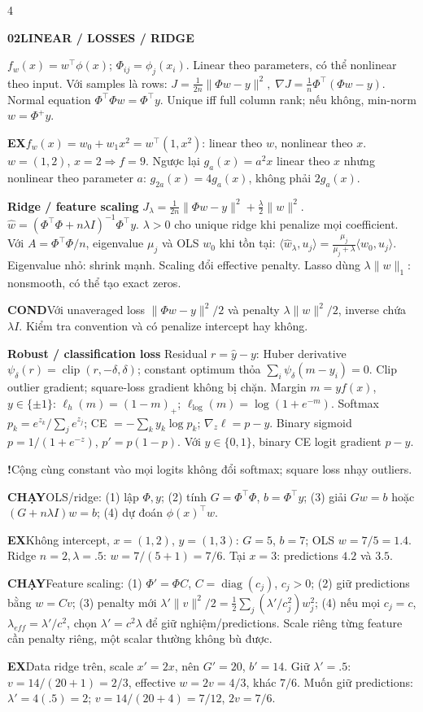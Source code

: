 \documentclass[a4paper]{article}
\newcommand{\topic}[2]{\par\addvspace{.8pt}%
  \begingroup\setlength{\fboxsep}{0.5pt}%
  \noindent\colorbox{structure}{\parbox{\dimexpr\linewidth-2\fboxsep\relax}{%
    \color{white}\fontsize{6.5}{7.1}\selectfont\bfseries #1\enspace #2}}%
  \endgroup\par\nobreak\vspace{.3pt}\nobreak}
\newcommand{\run}[1]{\key{CHẠY}#1}
\newcommand{\key}[1]{\par\textcolor{structure}{\textbf{#1}}\enspace}
\newcommand{\note}[4]{\par\begingroup\setlength{\fboxsep}{0.15pt}%
  \noindent\colorbox{#1}{\parbox{\dimexpr\linewidth-2\fboxsep\relax}{%
    \RaggedRight\textcolor{#2}{\textbf{#3}}\enspace #4}}%
  \endgroup\par}
\newcommand{\cond}[1]{\note{conditionbg}{condition}{COND}{#1}}
\newcommand{\trap}[1]{\note{warningbg}{warning}{!}{#1}}
\newcommand{\ex}[1]{\note{examplebg}{example}{EX}{#1}}
\newcommand{\norm}[1]{\lVert#1\rVert}
\newcommand{\diag}{\operatorname{diag}}
\begin{document}
\begin{multicols*}{4}
\topic{02}{LINEAR / LOSSES / RIDGE}
$f_w(x)=w^\top\phi(x)$; $\Phi_{ij}=\phi_j(x_i)$. Linear theo parameters, có thể nonlinear theo input. Với samples là rows:
$J=\tfrac1{2n}\norm{\Phi w-y}^2,\; \nabla J=\tfrac1n\Phi^\top(\Phi w-y).$
Normal equation $\Phi^\top\Phi w=\Phi^\top y$. Unique iff full column rank; nếu không, min-norm $w=\Phi^+y$.
\ex{$f_w(x)=w_0+w_1x^2=w^\top(1,x^2)$: linear theo $w$, nonlinear theo $x$. $w=(1,2)$, $x=2\Rightarrow f=9$. Ngược lại $g_a(x)=a^2x$ linear theo $x$ nhưng nonlinear theo parameter $a$: $g_{2a}(x)=4g_a(x)$, không phải $2g_a(x)$.}
\key{Ridge / feature scaling}
$J_\lambda=\tfrac1{2n}\norm{\Phi w-y}^2+\tfrac\lambda2\norm w^2.$
$\hat w=(\Phi^\top\Phi+n\lambda I)^{-1}\Phi^\top y.$
$\lambda>0$ cho unique ridge khi penalize mọi coefficient. Với $A=\Phi^\top\Phi/n$, eigenvalue $\mu_j$ và OLS $w_0$ khi tồn tại:
$\langle\hat w_\lambda,u_j\rangle=\frac{\mu_j}{\mu_j+\lambda}\langle w_0,u_j\rangle.$
Eigenvalue nhỏ: shrink mạnh. Scaling đổi effective penalty. Lasso dùng $\lambda\norm w_1$: nonsmooth, có thể tạo exact zeros.
\cond{Với unaveraged loss $\norm{\Phi w-y}^2/2$ và penalty $\lambda\norm w^2/2$, inverse chứa $\lambda I$. Kiểm tra convention và có penalize intercept hay không.}
\key{Robust / classification loss}
Residual $r=\hat y-y$: Huber derivative $\psi_\delta(r)=\operatorname{clip}(r,-\delta,\delta)$; constant optimum thỏa $\sum_i\psi_\delta(m-y_i)=0$. Clip outlier gradient; square-loss gradient không bị chặn.
Margin $m=yf(x)$, $y\in\{\pm1\}$:
$\ell_h(m)=(1-m)_+$; $\ell_{\log}(m)=\log(1+e^{-m})$.
Softmax $p_k=e^{z_k}/\sum_je^{z_j}$;
CE $=-\sum_ky_k\log p_k$; $\nabla_z\ell=p-y$.
Binary sigmoid $p=1/(1+e^{-z})$, $p'=p(1-p)$. Với $y\in\{0,1\}$, binary CE logit gradient $p-y$.
\trap{Cộng cùng constant vào mọi logits không đổi softmax; square loss nhạy outliers.}
\run{OLS/ridge: (1) lập $\Phi,y$; (2) tính $G=\Phi^\top\Phi$, $b=\Phi^\top y$; (3) giải $Gw=b$ hoặc $(G+n\lambda I)w=b$; (4) dự đoán $\phi(x)^\top w$.}
\ex{Không intercept, $x=(1,2)$, $y=(1,3)$: $G=5$, $b=7$; OLS $w=7/5=1.4$. Ridge $n=2,\lambda=.5$: $w=7/(5+1)=7/6$. Tại $x=3$: predictions $4.2$ và $3.5$.}
\run{Feature scaling: (1) $\Phi'=\Phi C$, $C=\diag(c_j)$, $c_j>0$; (2) giữ predictions bằng $w=Cv$; (3) penalty mới $\lambda'\norm v^2/2=\tfrac12\sum_j(\lambda'/c_j^2)w_j^2$; (4) nếu mọi $c_j=c$, $\lambda_{eff}=\lambda'/c^2$, chọn $\lambda'=c^2\lambda$ để giữ nghiệm/predictions. Scale riêng từng feature cần penalty riêng, một scalar thường không bù được.}
\ex{Data ridge trên, scale $x'=2x$, nên $G'=20$, $b'=14$. Giữ $\lambda'=.5$: $v=14/(20+1)=2/3$, effective $w=2v=4/3$, khác $7/6$. Muốn giữ predictions: $\lambda'=4(.5)=2$; $v=14/(20+4)=7/12$, $2v=7/6$.}

\end{multicols*}
\end{document}
